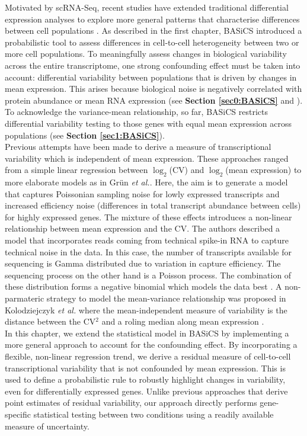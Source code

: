 Motivated by scRNA-Seq, recent studies have extended traditional differential expression analyses to explore more general patterns that characterise differences between cell populations \citep[e.g.~][]{Korthauer2016}. As described in the first chapter, BASiCS \citep{Vallejos2015BASiCS,Vallejos2016} introduced a probabilistic tool to assess differences in cell-to-cell heterogeneity between two or more cell populations. To meaningfully assess changes in biological variability across the entire transcriptome, one strong confounding effect must be taken into account: differential variability between populations that is driven by changes in mean expression. This arises because biological noise is negatively correlated with protein abundance \citep{Bar-Even2006, Newman2006, Taniguchi2011} or mean RNA expression (see \textbf{Section \ref{sec0:BASiCS}} and \citep{Brennecke2013, Antolovic2017}). To acknowledge the variance-mean relationship, so far, BASiCS restricts differential variability testing to those genes with equal mean expression across populations (see \textbf{Section \ref{sec1:BASiCS}}). \\


Previous attempts have been made to derive a measure of transcriptional variability which is independent of mean expression. These approaches ranged from a simple linear regression between $\log_2$(CV) and $\log_2$(mean expression) \citep{Wu2017} to more elaborate models as in Gr\"un \emph{et al.}. Here, the aim is to generate a model that captures Poissonian sampling noise for lowly expressed transcripts and increased efficiency noise (differences in total transcript abundance between cells) for highly expressed genes. The mixture of these effects introduces a non-linear relationship between mean expression and the CV. The authors described a model that incorporates reads coming from technical spike-in RNA to capture technical noise in the data. In this case, the number of transcripts available for sequencing is Gamma distributed due to variation in capture efficiency. The sequencing process on the other hand is a Poisson process. The combination of these distribution forms a negative binomial which models the data best \cite{Grun2014}. A non-parmateric strategy to model the mean-variance relationship was proposed in Kolodziejczyk \emph{et al.} where the mean-independent measure of variability is the distance between the CV$^2$ and a roling median along mean expression \citep{Kolodziejczyk2015cell}.\\

In this chapter, we extend the statistical model in BASiCS by implementing a more general approach to account for the confounding effect. By incorporating a flexible, non-linear regression trend, we derive a residual measure of cell-to-cell transcriptional variability that is not confounded by mean expression. This is used to define a probabilistic rule to robustly highlight changes in variability, even for differentially expressed genes. Unlike previous approaches that derive point estimates of residual variability, our approach directly performs gene-specific statistical testing between two conditions using a readily available measure of uncertainty. \\

